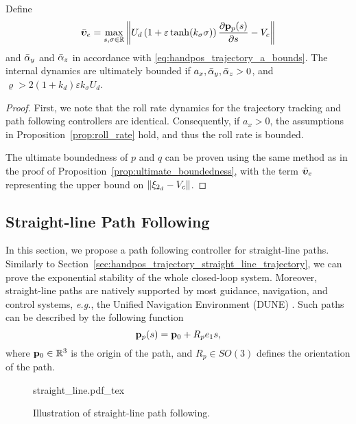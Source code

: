 \begin{prop}
    Define 
    \begin{equation}
        \Bar{\bm{\upsilon}}_e = \max_{s, \sigma \in \mathbb{R}} \left\|
            U_d\left(1 + \varepsilon\tanh(k_{\sigma}\sigma)\right) \frac{\partial \mathbf{p}_p(s)}{\partial s}
            - V_c\right\|
    \end{equation}
    and $\Bar{\alpha}_y$ and $\Bar{\alpha}_z$ in accordance with \eqref{eq:handpos_trajectory_a_bounds}.
    The internal dynamics are ultimately bounded if $a_x, \Bar{\alpha}_y, \Bar{\alpha}_z > 0$, and $\varrho > 2\left(1 + k_d\right)\varepsilon k_{\sigma} U_d$.
    \label{prop:ultimate_boundedness_path}
\end{prop}
\begin{proof}
    First, we note that the roll rate dynamics for the trajectory tracking and path following controllers are identical.
    Consequently, if $a_x > 0$, the assumptions in Proposition~\ref{prop:roll_rate} hold, and thus the roll rate is bounded.

    The ultimate boundedness of $p$ and $q$ can be proven using the same method as in the proof of Proposition~\ref{prop:ultimate_boundedness},
    with the term $\Bar{\bm{\upsilon}}_e$ representing the upper bound on $\left\|\xi_{2_d} - V_c\right\|$.
\end{proof}

\subsection{Straight-line Path Following}
\label{sec:handpos_trajectory_straight_line_path}
In this section, we propose a path following controller for straight-line paths.
Similarly to Section~\ref{sec:handpos_trajectory_straight_line_trajectory}, we can prove the exponential stability of the whole closed-loop system.
Moreover, straight-line paths are natively supported by most guidance, navigation, and control systems, \emph{e.g.}, the Unified Navigation Environment (DUNE) \cite{dune}.
Such paths can be described by the following function
\begin{equation}
    \mathbf{p}_p(s) = \mathbf{p}_0 + R_p e_1 s, \label{eq:handpos_trajectory_straight_line_function}
\end{equation}
where $\mathbf{p}_0 \in \mathbb{R}^3$ is the origin of the path, and $R_{p} \in SO(3)$ defines the orientation of the path.

\begin{figure}[b]
    \centering
    \def\svgwidth{0.4\textwidth}
    {straight_line.pdf_tex}
    \vspace*{-4mm}
    \caption{Illustration of straight-line path following.}
    \label{fig:straight_line}
\end{figure}

